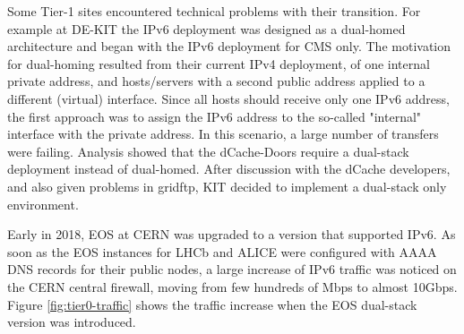 Some Tier-1 sites encountered technical problems with their transition.
For example at DE-KIT the IPv6 deployment was designed as a dual-homed architecture
and began with the IPv6 deployment for 
CMS only. The motivation for dual-homing resulted from their current IPv4 deployment,
of one internal private address, and 
hosts/servers with a second public address applied to a different (virtual) interface. 
Since all hosts should receive only one IPv6 address, the first approach was to assign the IPv6 address to the so-called "internal" interface with the private address. 
In this scenario, a large number of transfers were failing. 
Analysis showed that the dCache-Doors require a dual-stack deployment instead of dual-homed. 
After discussion with the dCache developers, and also given problems in gridftp, KIT decided to implement a dual-stack only environment.
  
Early in 2018, EOS \cite{eos} at CERN was upgraded to a version that supported IPv6.  
As soon as the EOS instances for LHCb and ALICE were configured with AAAA DNS records for their public nodes, a large increase of IPv6 traffic was noticed on the CERN central firewall, moving from few hundreds of Mbps to almost 10Gbps. 
Figure \ref{fig:tier0-traffic} shows the traffic increase when the EOS dual-stack version was introduced.
 
